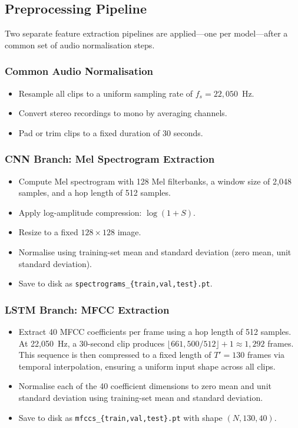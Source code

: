 \documentclass[12pt, a4paper]{article}
\begin{document}
\subsection{Preprocessing Pipeline}

Two separate feature extraction pipelines are applied---one per model---after a common
set of audio normalisation steps.

\subsubsection{Common Audio Normalisation}
\begin{itemize}[noitemsep, topsep=2pt]
    \item Resample all clips to a uniform sampling rate of $f_s = 22{,}050$~Hz.
    \item Convert stereo recordings to mono by averaging channels.
    \item Pad or trim clips to a fixed duration of 30 seconds.
\end{itemize}

\subsubsection{CNN Branch: Mel Spectrogram Extraction}
\begin{itemize}[noitemsep, topsep=2pt]
    \item Compute Mel spectrogram with 128 Mel filterbanks, a window size of 2{,}048
          samples, and a hop length of 512 samples.
    \item Apply log-amplitude compression: $\log(1 + S)$.
    \item Resize to a fixed $128 \times 128$ image.
    \item Normalise using training-set mean and standard deviation (zero mean, unit standard deviation).
    \item Save to disk as \texttt{spectrograms\_\{train,val,test\}.pt}.
\end{itemize}

\subsubsection{LSTM Branch: MFCC Extraction}
\begin{itemize}[noitemsep, topsep=2pt]
    \item Extract 40 MFCC coefficients per frame using a hop length of 512 samples.
          At 22{,}050~Hz, a 30-second clip produces $\lfloor 661{,}500 / 512 \rfloor + 1
          \approx 1{,}292$ frames. This sequence is then compressed to a fixed length of
          $T' = 130$ frames via temporal interpolation, ensuring a uniform input shape
          across all clips.
    \item Normalise each of the 40 coefficient dimensions to zero mean and unit standard deviation using training-set mean and standard deviation.
    \item Save to disk as \texttt{mfccs\_\{train,val,test\}.pt} with shape
          $(N, 130, 40)$.
\end{itemize}
\end{document}
